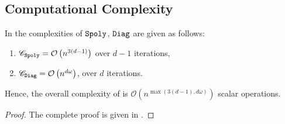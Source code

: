 
\subsection{Computational Complexity}
\begin{theorem}\label{thm:iterationCost}
    In  the complexities of $\texttt{Spoly}$, $\texttt{Diag}$ are given as follows:
    \begin{enumerate}[\itshape i)]
        \item $\mathscr{C}_{\texttt{Spoly}} = \mathcal{O}\left( n^{3(d-1)} \right)$ over $d-1$ iterations,
        \item $\mathscr{C}_{\texttt{Diag}} = \mathcal{O}\left(n^{d\omega}\right)$, over $d$ iterations. 
    \end{enumerate}
    Hence, the overall complexity of  is $\mathcal{O}\left(n^{\max(3(d-1), d\omega)}\right)$ scalar operations.
\end{theorem}

\begin{proof}
    The complete proof is given in .    
\end{proof}

